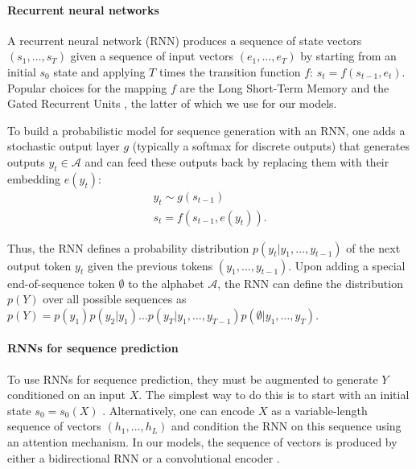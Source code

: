\documentclass{article} \usepackage{iclr2017_conference,times}
\begin{document}
\paragraph{Recurrent neural networks}

A recurrent neural network (RNN) produces a sequence of state vectors $(s_1,
\ldots, s_T)$ given a sequence of input vectors $(e_1, \ldots, e_T)$ by
starting from an initial $s_0$ state and applying $T$ times the transition
function $f$: $s_{t} = f(s_{t-1}, e_t)$. Popular choices for the mapping $f$ are the Long Short-Term Memory \citep{hochreiter1997long} and the Gated
Recurrent Units \citep{cho2014learning}, the latter of which we use for our models. 

To build a probabilistic model for sequence generation with an RNN,
one adds a stochastic output layer $g$ (typically a softmax for discrete outputs)
that generates outputs $y_t \in \mathcal{A}$ 
and can feed these outputs back by replacing them with their embedding $e(y_t)$:
\begin{align}
    y_t \sim g(s_{t-1}) \\
    s_t = f(s_{t - 1}, e(y_t)).
\end{align}    


Thus, the RNN defines a probability distribution $p(y_t|y_1, \ldots, y_{t-1})$
of the next output token $y_t$ given the previous tokens $(y_1, \ldots, y_{t-1})$.
Upon adding a special end-of-sequence token $\emptyset$ to the alphabet
$\mathcal{A}$, the RNN can define the distribution $p(Y)$ over all possible
sequences as $p(Y) = p(y_1) p(y_2 | y_1) \ldots p(y_T|y_1, \ldots, y_{T - 1})
p(\emptyset | y_1, \ldots, y_T)$.

\paragraph{RNNs for sequence prediction}
To use RNNs for sequence prediction, they must be augmented 
to generate $Y$ conditioned on an input $X$. The simplest way to do this
is to start with an initial state $s_0=s_0(X)$ 
\citep{sutskever2014sequence,cho2014learning}. Alternatively, one can 
encode $X$ as a variable-length sequence of vectors $(h_1, \ldots, h_L)$ and condition
the RNN on this sequence using an attention mechanism.
In our models, the sequence of vectors is produced by either a bidirectional RNN
\citep{schuster1997bidirectional} or a convolutional encoder \citep{rush2015neural}.
\end{document}

